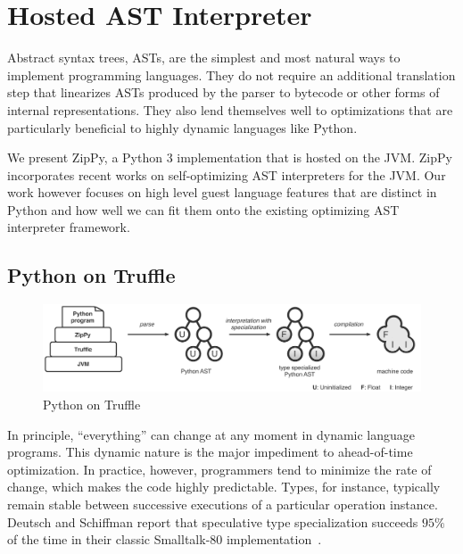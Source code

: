 \chapter{Hosted AST Interpreter}
\label{chp:ch3-zippy}

Abstract syntax trees, ASTs, are the simplest and most natural ways to implement programming languages.
They do not require an additional translation step that linearizes ASTs produced by the parser to bytecode or other forms of internal representations.
They also lend themselves well to optimizations that are particularly beneficial to highly dynamic languages like Python.

We present ZipPy, a Python 3 implementation that is hosted on the JVM.
ZipPy incorporates recent works on self-optimizing AST interpreters for the JVM.
Our work however focuses on high level guest language features that are distinct in Python and
how well we can fit them onto the existing optimizing AST interpreter framework.

\section{Python on Truffle}

\begin{figure}[t]
\centering
\includegraphics[scale=.6]{figures/ch3-python-on-truffle.pdf}
\caption{Python on Truffle}
\label{fig:python-on-truffle}
\end{figure}

In principle, ``everything'' can change at any moment in dynamic language programs.
This dynamic nature is the major impediment to ahead-of-time optimization.
In practice, however, programmers tend to minimize the rate of change, which makes the code highly predictable.
Types, for instance, typically remain stable between successive executions of a particular operation instance.
Deutsch and Schiffman report that speculative type specialization succeeds $95\%$ of the time in their classic Smalltalk-80 implementation~\cite{Deutsch1984}.

